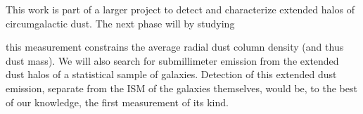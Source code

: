 \documentclass[11pt, oneside]{article}   	%
\begin{document}
This work is part of a larger project to detect and characterize extended halos of circumgalactic dust. The next phase will by studying 

this measurement constrains the average radial dust column density (and thus dust mass). We will also search for submillimeter emission from the extended dust halos of a statistical sample of galaxies.  Detection of this extended dust emission, separate from the ISM of the galaxies themselves, would be, to the best of our knowledge, the first measurement of its kind. 
\printbibliography
\end{document}
